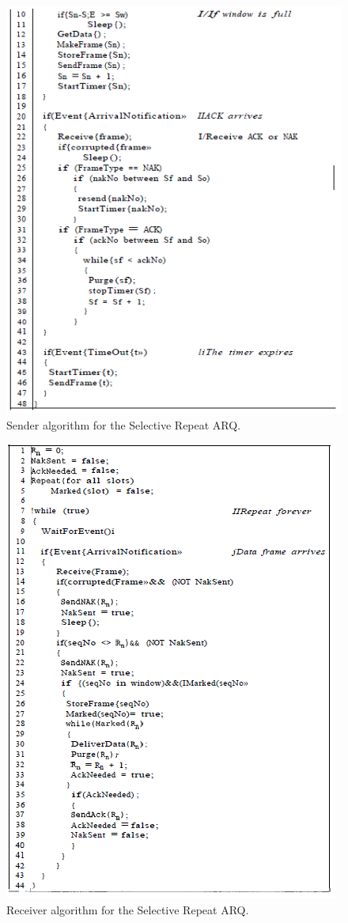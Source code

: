 \begin{figure}[H]
\begin{center}
\includegraphics[scale=1]{senderselective2.PNG} 
\caption{Sender algorithm for the Selective Repeat ARQ.}
\end{center}
\end{figure}
\begin{figure}[H]
\begin{center}
\includegraphics[scale=1]{receiverselective.PNG}  
\caption{Receiver algorithm for the Selective Repeat ARQ.}
\end{center}
\end{figure}
